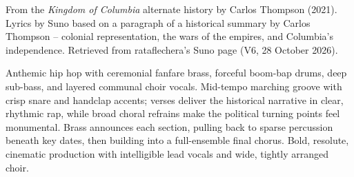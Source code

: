 
\begin{notes}
From the \emph{Kingdom of Columbia} alternate history by Carlos Thompson (2021). Lyrics by Suno based on a paragraph of a historical summary by Carlos Thompson -- colonial representation, the wars of the empires, and Columbia's independence. Retrieved from rataflechera's Suno page (V6, 28 October 2026).
\end{notes}
\begin{style}
Anthemic hip hop with ceremonial fanfare brass, forceful boom-bap drums, deep sub-bass, and layered communal choir vocals. Mid-tempo marching groove with crisp snare and handclap accents; verses deliver the historical narrative in clear, rhythmic rap, while broad choral refrains make the political turning points feel monumental. Brass announces each section, pulling back to sparse percussion beneath key dates, then building into a full-ensemble final chorus. Bold, resolute, cinematic production with intelligible lead vocals and wide, tightly arranged choir.
\end{style}
